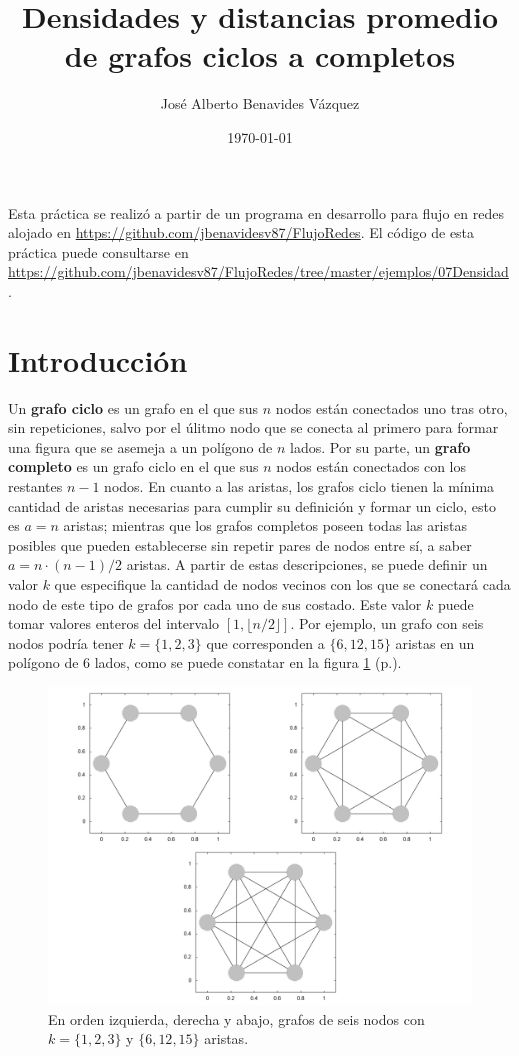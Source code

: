 \documentclass{article}
\title{Densidades y distancias promedio de grafos ciclos a completos}
\author{José Alberto Benavides Vázquez}
\date{\today}
\begin{document}
  \maketitle

  Esta práctica se realizó a partir de un programa en desarrollo para flujo en redes alojado en \url{https://github.com/jbenavidesv87/FlujoRedes}. El código de esta práctica puede consultarse en \url{https://github.com/jbenavidesv87/FlujoRedes/tree/master/ejemplos/07Densidad} \cite{Grafos}.

  \section{Introducción}

  Un \textbf{grafo ciclo} es un grafo en el que sus $n$ nodos están conectados uno tras otro, sin repeticiones, salvo por el úlitmo nodo que se conecta al primero para formar una figura que se asemeja a un polígono de $n$ lados. Por su parte, un \textbf{grafo completo} es un grafo ciclo en el que sus $n$ nodos están conectados con los restantes $n - 1$ nodos. En cuanto a las aristas, los grafos ciclo tienen la mínima cantidad de aristas necesarias para cumplir su definición y formar un ciclo, esto es $a = n$ aristas; mientras que los grafos completos poseen todas las aristas posibles que pueden establecerse sin repetir pares de nodos entre sí, a saber $a = n \cdot (n-1)/2$ aristas. A partir de estas descripciones, se puede definir un valor $k$ que especifique la cantidad de nodos vecinos con los que se conectará cada nodo de este tipo de grafos por cada uno de sus costado. Este valor $k$ puede tomar valores enteros del intervalo $[1, \lfloor n / 2 \rfloor]$. Por ejemplo, un grafo con seis nodos podría tener $k = \{ 1, 2, 3 \}$ que corresponden a $\{ 6, 12, 15 \}$ aristas en un polígono de 6 lados, como se puede constatar en la figura \ref{grafoEjemplo6} (p.\pageref{grafoEjemplo6}).

  \begin{figure}[h]
    \includegraphics[width=1\textwidth]{grafoEjemplo6}
    \centering
    \caption{En orden izquierda, derecha y abajo, grafos de seis nodos con $k = \{ 1, 2, 3 \}$ y $\{ 6, 12, 15 \}$ aristas.}
    \label{grafoEjemplo6}
  \end{figure}
\end{document}
